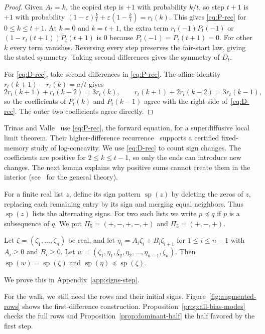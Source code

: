 \begin{proof}
Given $A_t=k$, the copied step is $+1$ with probability $k/t$, so step $t+1$
is $+1$ with probability $(1-\varepsilon)\frac kt+\varepsilon(1-\frac
kt)=r_t(k)$. This gives \eqref{eq:P-rec} for $0\le k\le t+1$. At $k=0$ and
$k=t+1$, the extra term $r_t(-1)P_t(-1)$ or
$(1-r_t(t+1))P_t(t+1)$ is $0$ because $P_t(-1)=P_t(t+1)=0$.
For other $k$ every term vanishes.
Reversing every step preserves the fair-start law, giving the stated
symmetry. Taking second differences gives the symmetry of $D_t$.

For \eqref{eq:D-rec}, take second differences in \eqref{eq:P-rec}.
The affine identity $r_t(k+1)-r_t(k)=a/t$ gives
\[
 2r_t(k+1)+r_t(k-2)=3r_t(k),\qquad
 r_t(k+1)+2r_t(k-2)=3r_t(k-1),
\]
so the coefficients of $P_t(k)$ and $P_t(k-1)$ agree with the
right side of~\eqref{eq:D-rec}. The outer two coefficients agree directly.
\end{proof}

Trinas and Valle~\cite[(2.2)]{tv2026} use \eqref{eq:P-rec}, the forward equation, for a superdiffusive local
limit theorem. Their higher-difference recurrence~\cite[(4.10)]{tv2026}
supports a certified fixed-memory study of log-concavity. We use
\eqref{eq:D-rec} to count sign changes. The coefficients are positive
for $2\le k\le t-1$, so only the ends can introduce new changes.
The next lemma explains why positive sums cannot create them in
the interior (see~\cite{karlin1964,karlin1968} for the general theory).

For a finite real list $z$, define its sign pattern
$\operatorname{sp}(z)$ by deleting the zeros of $z$, replacing each
remaining entry by its sign and merging equal neighbors. Thus
$\operatorname{sp}(z)$ lists the alternating signs. For
two such lists we write $p\preceq q$ if $p$ is a subsequence of $q$. We put
$\Pi_5=(+,-,+,-,+)$ and $\Pi_3=(+,-,+)$.

\begin{lemma}\label{lem:interleave}
Let $\zeta=(\zeta_1,\dots,\zeta_n)$ be real, and let
$\eta_i=A_i\zeta_i+B_i\zeta_{i+1}$ for $1\le i\le n-1$ with $A_i\ge0$ and
$B_i\ge0$. Let $w=(\zeta_1,\eta_1,\zeta_2,\eta_2,\dots,\eta_{n-1},\zeta_n)$.
Then $\operatorname{sp}(w)=\operatorname{sp}(\zeta)$ and
$\operatorname{sp}(\eta)\preceq\operatorname{sp}(\zeta)$.
\end{lemma}

We prove this in Appendix~\ref{app:signs-step}.

For the walk, we still need the rows and their initial signs.
Figure~\ref{fig:augmented-rows} shows the first-difference construction.
Proposition~\ref{prop:all-bias-modes} checks the full rows and
Proposition~\ref{prop:dominant-half} the half favored by the first step.


